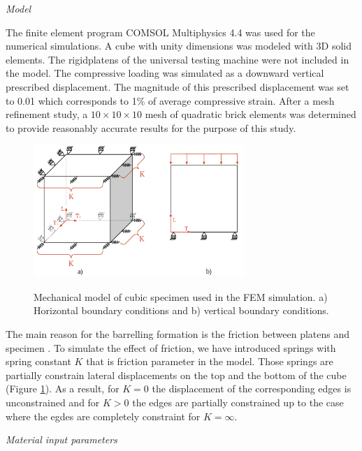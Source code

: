 \documentclass[review]{elsarticle}
\begin{document}
\begin{description}
\item{\textit{Model}}
\end{description}





The finite element program COMSOL Multiphysics 4.4 \cite{Comsol} was used for
the numerical simulations.
A cube with unity dimensions was modeled with
3D solid elements.
The rigidplatens of the universal testing machine were not included in the
model.
The compressive loading was simulated as a downward vertical prescribed
displacement. The magnitude of this prescribed displacement was set to 0.01
which corresponds to  1\%  of average compressive strain.
After a mesh refinement study, a $10\times10\times10$ mesh of quadratic brick
elements was determined to provide reasonably accurate results for the purpose of this study.

\begin{figure}[h]
\centering
\includegraphics[width=8cm]{BarellingPaper.pdf}
\label{fig:Barrelling}
\caption{\label{fig:Barrelling} Mechanical model of cubic
specimen used in the FEM simulation. 
a) Horizontal boundary conditions and b) vertical boundary conditions.}
\end{figure}

The main reason for the barrelling formation is the friction between platens
and specimen \cite{Narayanasamy198821, kulkarni1969}. To simulate the effect of
friction, we have introduced springs with spring constant $K$ that is friction parameter
in the model. Those springs are partially constrain lateral displacements
on the top and the bottom of the cube (Figure \ref{fig:Barrelling}).  
As a result, for $K=0$ the displacement of the corresponding
edges is unconstrained and for $K>0$ the edges are partially constrained up to
the case where the egdes are completely constraint for $K=\infty$.

\begin{description}
\item{\textit{Material input parameters}}
\end{description}
\end{document}
